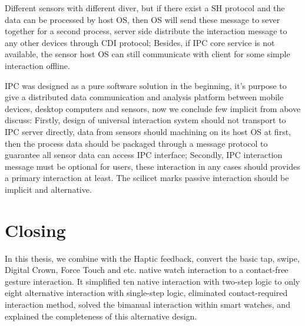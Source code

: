 Different sensors with different diver, but if there exist a SH protocol and the data can be processed by host OS, then OS will send these message to sever together for a second process, server side distribute the interaction message to any other devices through CDI protocol; Besides, if IPC core service is not available, the sensor host OS can still communicate with client for some simple interaction offline.


IPC was designed as a pure software solution in the beginning, it's purpose to give a distributed data communication and analysis platform between mobile devices, desktop computers and sensors, now we conclude few implicit from above discuss:
Firstly, design of universal interaction system should not transport to IPC server directly, data from sensors should machining on its host OS at first, then the process data should be packaged through a message protocol to guarantee all sensor data can access IPC interface;
Secondly, IPC interaction message must be optional for users, these interaction in any cases should provides a primary interaction at least. The scilicet marks passive interaction should be implicit and alternative.

\section{Closing}

In this thesis, we combine with the Haptic feedback, convert the basic tap, swipe, Digital Crown, Force Touch and etc. native watch interaction to a contact-free gesture interaction. It simplified ten native interaction with two-step logic to only eight alternative interaction with single-step logic, eliminated contact-required interaction method, solved the bimanual interaction within smart watches, and explained the completeness of this alternative design.

